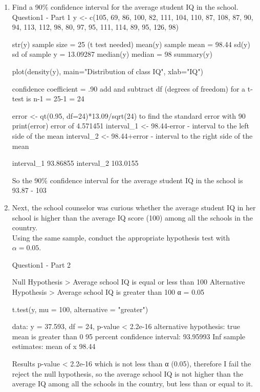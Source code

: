 \documentclass[12pt,letterpaper]{article}
\begin{document}
\begin{enumerate}
	\item Find a 90\% confidence interval for the average student IQ in the school.\\
	
	Question1 - Part 1
	y <- c(105, 69, 86, 100, 82, 111, 104, 110, 87, 108, 87, 90, 94, 113, 112, 98, 80, 97, 95, 111, 114, 89, 95, 126, 98)
	
	str(y)  sample size = 25 (t test needed)
	mean(y)  sample mean = 98.44
	sd(y)  sd of sample y = 13.09287
	median(y)  median = 98
	summary(y)
	
	plot(density(y),
	main="Distribution of class IQ",
	xlab="IQ")
	
	confidence coefficient = .90 add and subtract 
	df (degrees of freedom) for a t-test is n-1 = 25-1 = 24
	
	error <- qt(0.95, df=24)*13.09/sqrt(24) to find the standard error with 90%
	print(error) error of 4.571451
	interval_1 <- 98.44-error - interval to the left side of the mean
	interval_2 <- 98.44+error - interval to the right side of the mean
	
	interval_1 93.86855
	interval_2 103.0155
	
	So the 90\% confidence interval for the average student IQ in the school is 93.87 - 103
	
	\item Next, the school counselor was curious  whether  the average student IQ in her school is higher than the average IQ score (100) among all the schools in the country.\\ 
	
	\noindent Using the same sample, conduct the appropriate hypothesis test with $\alpha=0.05$.
	
	Question1 - Part 2
	
	Null Hypothesis > Average school IQ is equal or less than 100
	Alternative Hypothesis > Average school IQ is greater than 100
	α = 0.05
	
	t.test(y, mu = 100, alternative = "greater")
	
	data:  y
	= 37.593, df = 24, p-value < 2.2e-16
	alternative hypothesis: true mean is greater than 0
	95 percent confidence interval:
	93.95993      Inf
	sample estimates:
	mean of x 
	 98.44 
	
	 Results
	 p-value < 2.2e-16 which is not less than α (0.05), therefore I fail the reject the null hypothesis, so the average school IQ is not higher than the average IQ among all the schools in the country, but less than or equal to it. 
	
\end{enumerate}
\end{document}
